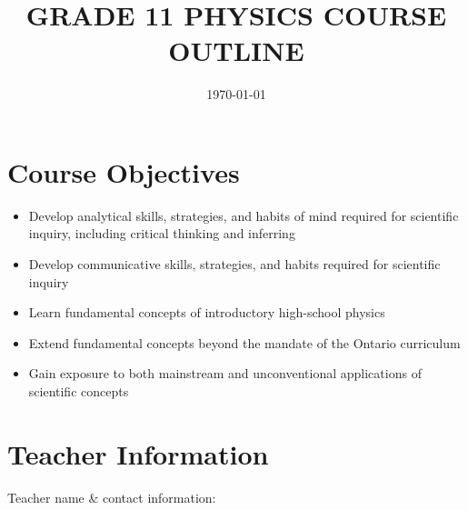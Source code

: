 \documentclass{../oss-handout}
\title{GRADE 11 PHYSICS COURSE OUTLINE}
\author{}
\date{\today}
\begin{document}
\thispagestyle{title}
\gentitle



\section{Course Objectives}
\begin{itemize}[nosep,leftmargin=20pt]
\item Develop analytical skills, strategies, and habits of mind required for
  scientific inquiry, including critical thinking and inferring
\item Develop communicative skills, strategies, and habits required for
  scientific inquiry
\item Learn fundamental concepts of introductory high-school physics
\item Extend fundamental concepts beyond the mandate of the Ontario curriculum
\item Gain exposure to both mainstream and unconventional applications of
  scientific concepts
\end{itemize}



\section{Teacher Information}
Teacher name \& contact information: \underline{\hspace{4.5in}}
\end{document}
